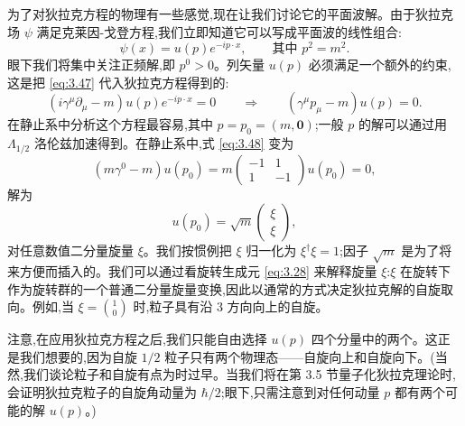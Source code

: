 为了对狄拉克方程的物理有一些感觉,现在让我们讨论它的平面波解。由于狄拉克场 $\psi$ 满足克莱因-戈登方程,我们立即知道它可以写成平面波的线性组合:
\begin{equation}
  \psi(x) = u(p)e^{-ip\cdot x},\qquad \text{其中 } p^2 = m^2 .
  \label{eq:3.47}
\end{equation}
眼下我们将集中关注正频解,即 $p^0>0$。列矢量 $u(p)$ 必须满足一个额外的约束,这是把 \eqref{eq:3.47} 代入狄拉克方程得到的:
\begin{equation}
  (i\gamma^\mu\partial_\mu - m)u(p)e^{-ip\cdot x} = 0
  \qquad\Rightarrow\qquad
  (\gamma^\mu p_\mu - m)u(p) = 0 .
  \label{eq:3.48}
\end{equation}
在静止系中分析这个方程最容易,其中 $p = p_0 = (m, \mathbf{0})$;一般 $p$ 的解可以通过用 $\Lambda_{1/2}$ 洛伦兹加速得到。在静止系中,式 \eqref{eq:3.48} 变为
\begin{equation}
  (m\gamma^0 - m)u(p_0) = m
    \begin{pmatrix}-1&1\\1&-1\end{pmatrix}u(p_0) = 0 ,
\end{equation}
解为
\begin{equation}
  u(p_0) = \sqrt{m}\begin{pmatrix}\xi\\ \xi\end{pmatrix},
  \label{eq:3.49}
\end{equation}
对任意数值二分量旋量 $\xi$。我们按惯例把 $\xi$ 归一化为 $\xi^\dagger\xi = 1$;因子 $\sqrt{m}$ 是为了将来方便而插入的。我们可以通过看旋转生成元 \eqref{eq:3.28} 来解释旋量 $\xi$:$\xi$ 在旋转下作为旋转群的一个普通二分量旋量变换,因此以通常的方式决定狄拉克解的自旋取向。例如,当 $\xi = \binom{1}{0}$ 时,粒子具有沿 3 方向向上的自旋。

注意,在应用狄拉克方程之后,我们只能自由选择 $u(p)$ 四个分量中的两个。这正是我们想要的,因为自旋 $1/2$ 粒子只有两个物理态——自旋向上和自旋向下。(当然,我们谈论粒子和自旋有点为时过早。当我们将在第 3.5 节量子化狄拉克理论时,会证明狄拉克粒子的自旋角动量为 $\hbar/2$;眼下,只需注意到对任何动量 $p$ 都有两个可能的解 $u(p)$。)

